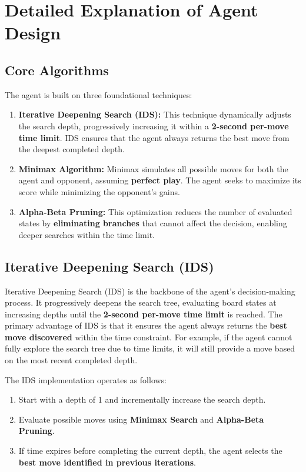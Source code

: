 \documentclass[11pt]{article}
\begin{document}
\section*{Detailed Explanation of Agent Design}

\subsection*{Core Algorithms}
The agent is built on three foundational techniques:
\begin{enumerate}
    \item \textbf{Iterative Deepening Search (IDS):} This technique dynamically adjusts the search depth, progressively increasing it within a \textbf{2-second per-move time limit}. IDS ensures that the agent always returns the best move from the deepest completed depth.
    \item \textbf{Minimax Algorithm:} Minimax simulates all possible moves for both the agent and opponent, assuming \textbf{perfect play}. The agent seeks to maximize its score while minimizing the opponent's gains.
    \item \textbf{Alpha-Beta Pruning:} This optimization reduces the number of evaluated states by \textbf{eliminating branches} that cannot affect the decision, enabling deeper searches within the time limit.
\end{enumerate}

\subsection*{Iterative Deepening Search (IDS)}
Iterative Deepening Search (IDS) is the backbone of the agent's decision-making process. It progressively deepens the search tree, evaluating board states at increasing depths until the \textbf{2-second per-move time limit} is reached. The primary advantage of IDS is that it ensures the agent always returns the \textbf{best move discovered} within the time constraint. For example, if the agent cannot fully explore the search tree due to time limits, it will still provide a move based on the most recent completed depth.

\noindent The IDS implementation operates as follows:
\begin{enumerate}
    \item Start with a depth of 1 and incrementally increase the search depth.
    \item Evaluate possible moves using \textbf{Minimax Search} and \textbf{Alpha-Beta Pruning}.
    \item If time expires before completing the current depth, the agent selects the \textbf{best move identified in previous iterations}.
\end{enumerate}
\end{document}
